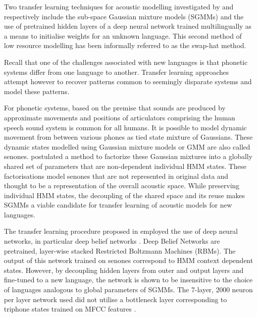 Two transfer learning techniques for acoustic modelling investigated by \cite{povey2011subspace} and \cite{ghoshal2013multilingual} respectively include the sub-space Gaussian mixture models (SGMMs) and the use of pretrained hidden layers of a deep neural network trained multilingually as a means to initialise weights for an unknown language.  This second method of low resource modelling has been informally referred to as the swap-hat method.

Recall that one of the challenges associated with new languages is that phonetic systems differ from one language to another.  Transfer learning approaches attempt however to recover patterns common to seemingly disparate systems and model these patterns.  

For phonetic systems, based on the premise that sounds are produced by approximate movements and positions of articulators comprising the human speech sound system is common for all humans.  It is possible to model dynamic movement from between various phones as tied state mixture of Gaussians. These dynamic states modelled using Gaussian mixture models or GMM are also called senones. \cite{povey2011subspace} postulated a method to factorize these Gaussian mixtures into a globally shared set of parameters that are non-dependent individual HMM states.  These factorisations model senones that are not represented in original data and thought to be a representation of the overall acoustic space.  While preserving individual HMM states, the decoupling of the shared space and its reuse makes SGMMs a viable candidate for transfer learning of acoustic models for new languages.

The transfer learning procedure proposed in \cite{ghoshal2013multilingual} employed the use of deep neural networks, in particular deep belief networks \citep{bengio2007greedy}.  Deep Belief Networks are pretrained, layer-wise  stacked Restricted Boltzmann Machines (RBMs)\citep{smolensky1986information}.  The output of this network trained on senones correspond to HMM context dependent states.  However, by decoupling hidden layers from outer and output layers and fine-tuned to a new language, the network is shown to be insensitive to the choice of languages analogous to global parameters of SGMMs. The 7-layer, 2000 neuron per layer network used did not utilise a bottleneck layer corresponding to triphone states trained on MFCC features \citep{grezl2008optimizing}.

